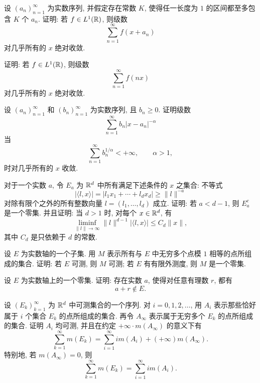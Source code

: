 \begin{exer}
	设 \((a_n)_{n=1}^{\infty}\) 为实数序列, 并假定存在常数 \(K\), 使得任一长度为 \(1\) 的区间都至多包含 \(K\) 个 \(a_n\). 证明: 若 \(f\in L^1(\mathbb{R})\), 则级数
	\[
	\sum_{n=1}^{\infty} f(x+a_n)
	\]
	对几乎所有的 \(x\) 绝对收敛.
\end{exer}

\begin{exer}
	证明: 若 \(f\in L^1(\mathbb{R})\), 则级数
	\[
	\sum_{n=1}^{\infty}f(nx)
	\]
	对几乎所有的 \(x\) 绝对收敛.
\end{exer}

\begin{exer}
	设 \((a_n)_{n=1}^{\infty}\) 和 \((b_n)_{n=1}^{\infty}\) 为实数序列, 且 \(b_n\geq0\). 证明级数
	\[
	\sum_{n=1}^{\infty} b_n |x-a_n|^{-\alpha}
	\]
	当
	\[
	\sum_{n=1}^{\infty} b_n^{1/\alpha}<+\infty,
	\qquad \alpha>1,
	\]
	时对几乎所有的 \(x\) 收敛.
\end{exer}

\begin{exer}
	对于一个实数 \(a\), 令 \(E_a\) 为 \(\mathbb{R}^d\) 中所有满足下述条件的 \(x\) 之集合: 不等式
	\[
	|\langle l,x\rangle|
	=|l_1x_1+\cdots+l_dx_d|
	\geq \|l\|^{-a}
	\]
	对除有限个之外的所有整数向量 \(l=(l_1,\ldots,l_d)\) 成立. 证明: 若 \(a<d-1\), 则 \(E_a^c\) 是一个零集. 并且证明: 当 \(d>1\) 时, 对每个 \(x\in\mathbb{R}^d\), 有
	\[
	\liminf_{\|l\|\to\infty}
	\|l\|^{d-1}|\langle l,x\rangle|
	\leq C_d\|x\|,
	\]
	其中 \(C_d\) 是只依赖于 \(d\) 的常数.
\end{exer}

\begin{exer}
	设 \(E\) 为实数轴的一个子集. 用 \(M\) 表示所有与 \(E\) 中无穷多个点模 \(1\) 相等的点所组成的集合. 证明: 若 \(E\) 可测, 则 \(M\) 可测; 若 \(E\) 有有限外测度, 则 \(M\) 是一个零集.
\end{exer}

\begin{exer}
	设 \(E\) 为实数轴上的一个零集. 证明: 存在实数 \(a\), 使得对任意有理数 \(r\), 都有
	\[
	a+r\notin E.
	\]
\end{exer}

\begin{exer}
	设 \((E_k)_{k=1}^{\infty}\) 为 \(\mathbb{R}^d\) 中可测集合的一个序列. 对 \(i=0,1,2,\ldots\), 用 \(A_i\) 表示那些恰好属于 \(i\) 个集合 \(E_k\) 的点所组成的集合. 再令 \(A_\infty\) 表示属于无穷多个 \(E_k\) 的点所组成的集合. 证明 \(A_i\) 均可测, 并且在约定 \(+\infty\cdot m(A_\infty)\) 的意义下有
	\[
	\sum_{k=1}^{\infty}m(E_k)
	=
	\sum_{i=1}^{\infty} i m(A_i)+(+\infty)m(A_\infty).
	\]
	特别地, 若 \(m(A_\infty)=0\), 则
	\[
	\sum_{k=1}^{\infty}m(E_k)
	=
	\sum_{i=1}^{\infty} i m(A_i).
	\]
\end{exer}

